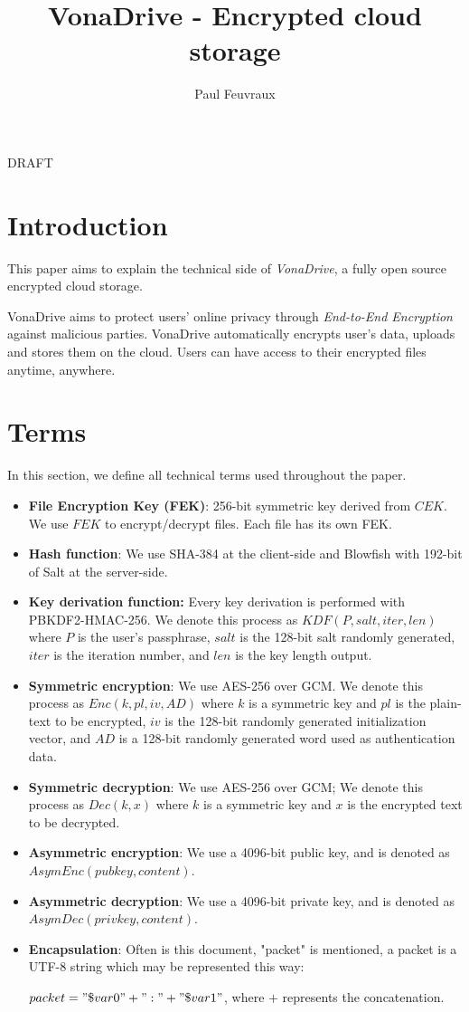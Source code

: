 \documentclass[a4paper,10pt]{article}
\title{VonaDrive - Encrypted cloud storage}
\author{Paul Feuvraux}
\begin{document}
\maketitle

DRAFT

\section{Introduction}
This paper aims to explain the technical side of \emph{VonaDrive}, a fully open source encrypted cloud storage.


VonaDrive aims to protect users' online privacy through \emph{End-to-End Encryption} against malicious parties.
VonaDrive automatically encrypts user's data, uploads and stores them on the cloud. Users can have access to their encrypted files anytime, anywhere.

\section{Terms}
In this section, we define all technical terms used throughout the paper.

\begin{itemize}
    \item \textbf{File Encryption Key (FEK)}:
        256-bit symmetric key derived from $CEK$. We use $FEK$ to encrypt/decrypt files. Each file has its own FEK.
    \item \textbf{Hash function}: We use SHA-384 at the client-side and Blowfish with 192-bit of Salt at the server-side.
    \item \textbf{Key derivation function:} Every key derivation is performed with PBKDF2-HMAC-256. We denote this process as
		$KDF(P,salt, iter, len)$ where $P$ is the user's passphrase, $salt$ is the 128-bit salt randomly generated, $iter$ is the
		iteration number, and $len$ is the key length output.
    \item \textbf{Symmetric encryption}: We use AES-256 over GCM.
        We denote this process as $Enc(k,pl, iv, AD)$ where $k$ is a symmetric key and $pl$ is the plain-text to be encrypted,
				$iv$ is the 128-bit randomly generated initialization vector, and $AD$ is a 128-bit randomly generated word used as
				authentication data.
    \item \textbf{Symmetric decryption}: We use AES-256 over GCM;
        We denote this process as $Dec(k, x)$ where $k$ is a symmetric key and $x$ is the encrypted text to be decrypted.
	\item \textbf{Asymmetric encryption}: We use a 4096-bit public key, and is denoted as $AsymEnc(pubkey, content)$.
	\item \textbf{Asymmetric decryption}: We use a 4096-bit private key, and is denoted as $AsymDec(privkey, content)$.
	\item \textbf{Encapsulation}:
	Often is this document, "packet" is mentioned, a packet is a UTF-8 string which may be represented this way:

	\vspace{5mm}

	$packet="\$var0"+":"+"\$var1"$, where $+$ represents the concatenation.

\end{itemize}
\end{document}

